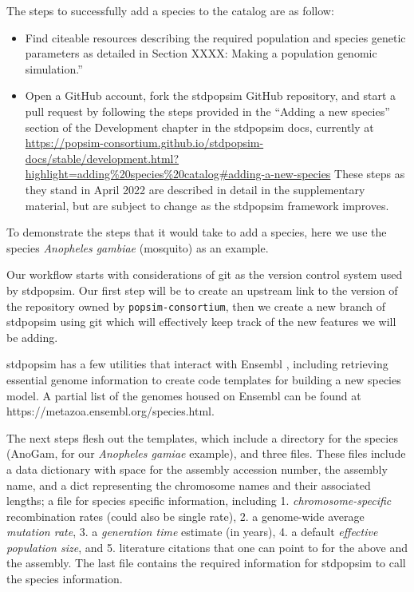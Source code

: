\documentclass[hidelinks]{article}
\providecommand{\tightlist}{%
\setlength{\itemsep}{0pt}\setlength{\parskip}{0pt}}
\begin{document}
The steps to successfully add a species to the catalog are as follow:

\begin{itemize}
\tightlist
\item
  Find citeable resources describing the required population and species
  genetic parameters as detailed in Section XXXX: Making a population
  genomic simulation.''
\item
  Open a GitHub account, fork the stdpopsim GitHub
  repository, and start a pull request by following the steps provided
  in the ``Adding a new species'' section of the Development chapter in
  the stdpopsim docs, currently at
  \url{https://popsim-consortium.github.io/stdpopsim-docs/stable/development.html?highlight=adding\%20species\%20catalog\#adding-a-new-species}
  These steps as they stand in April 2022 are described in detail in the
  supplementary material, but are subject to change as the stdpopsim
  framework improves.
\end{itemize}

To demonstrate the steps that it would take to add a species, here we
use the species \emph{Anopheles gambiae} (mosquito) as an example.

Our workflow starts with considerations of git as the version control
system used by stdpopsim. Our first step will be to create an upstream
link to the version of the repository owned by
\texttt{popsim-consortium}, then we create a new branch of stdpopsim
using git which will effectively keep track of the new features we will
be adding.

stdpopsim has a few utilities that interact with Ensembl \citep{ensembl2021},
including retrieving essential genome information to create code
templates for building a new species model. A partial list of the
genomes housed on Ensembl can be found at
https://metazoa.ensembl.org/species.html.

The next steps flesh out the templates, which include a directory for
the species (AnoGam, for our \emph{Anopheles gamiae} example), and three
files. These files include a data dictionary with space for the assembly
accession number, the assembly name, and a dict representing the
chromosome names and their associated lengths; a file for species
specific information, including 1. \emph{chromosome-specific}
recombination rates (could also be single rate), 2. a genome-wide
average \emph{mutation rate}, 3. a \emph{generation time} estimate (in
years), 4. a default \emph{effective population size}, and 5. literature
citations that one can point to for the above and the assembly. The last
file contains the required information for stdpopsim to call the species
information.
\end{document}

